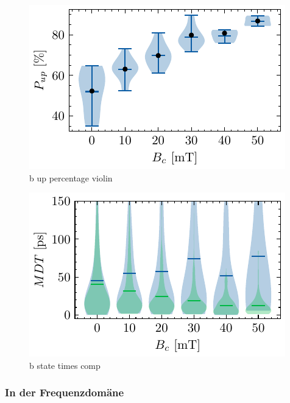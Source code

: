 \documentclass[main.tex]{subfiles}
\begin{document}
\begin{figure}[H]
    \centering
    \includegraphics{bilder/plots/max_Bz/up_percentage_violin.pdf}
    \caption{b up percentage violin}\label{fig:bz-up-percentage-violin}
\end{figure}

\begin{figure}[H]
    \centering
    \includegraphics{bilder/plots/max_Bz/state_times_comp.pdf}
    \caption{b state times comp}\label{fig:bz-state-times-comp}
\end{figure}

\subsubsection{In der Frequenzdomäne}
\end{document}
